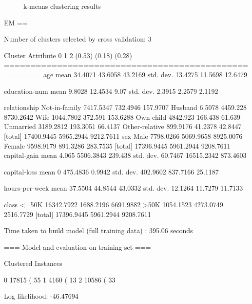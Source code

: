 \documentclass{sig-alternate}
\begin{document}
\begin{figure}[!htbp]
    \centering
    \theverbbox
    \caption{k-means clustering results\label{kmeans-summary}}
\end{figure}


\scriptsize
\begin{verbbox}
EM
==

Number of clusters selected by cross validation: 3


                     Cluster
Attribute                  0           1           2
                      (0.53)      (0.18)      (0.28)
=====================================================
age
  mean                34.4071     43.6058     43.2169
  std. dev.           13.4275     11.5698     12.6479

education-num
  mean                 9.8028     12.4534        9.07
  std. dev.            2.3915      2.2579      2.1192

relationship
   Not-in-family    7417.5347    732.4946    157.9707
   Husband             6.5078    4459.228   8730.2642
   Wife             1044.7802     372.591    153.6288
   Own-child         4842.923     166.438      61.639
   Unmarried        3189.2812    193.3051     66.4137
   Other-relative    899.9176     41.2378     42.8447
  [total]          17400.9445   5965.2944   9212.7611
sex
   Male             7798.0266   5069.9658   8925.0076
   Female           9598.9179    891.3286    283.7535
  [total]          17396.9445   5961.2944   9208.7611
capital-gain
  mean                  4.065   5506.3843     239.438
  std. dev.           60.7467  16515.2342    873.4603

capital-loss
  mean                      0    475.4836      0.9942
  std. dev.          402.9602    837.7166     25.1187

hours-per-week
  mean                37.5504     44.8544     43.0332
  std. dev.           12.1264     11.7279     11.7133

class
   <=50K           16342.7922   1688.2196   6691.9882
   >50K             1054.1523   4273.0749   2516.7729
  [total]          17396.9445   5961.2944   9208.7611


Time taken to build model (full training data) : 395.06 seconds

=== Model and evaluation on training set ===

Clustered Instances

0      17815 ( 55%
1       4160 ( 13%
2      10586 ( 33%

Log likelihood: -46.47694
\end{verbbox}
\normalsize
\end{document}
